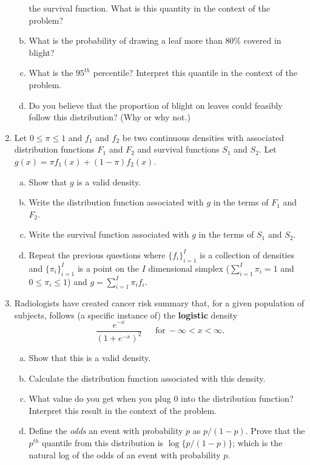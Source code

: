 \documentclass[12pt]{article}
\begin{document}
\begin{enumerate}[1.]
\begin{enumerate}[a.]
    the survival function. What is this quantity in the context of the problem?
  \item What is the probability of drawing a leaf more than 80\% covered in blight?
  \item What is the $95^{th}$ percentile? Interpret this quantile in the context of the problem.
  \item Do you believe that the proportion of blight on leaves could feasibly follow this
    distribution? (Why or why not.)
  \end{enumerate}
\item Let $0 \leq \pi \leq 1$ and $f_1$ and $f_2$ be two continuous
  densities with associated distribution functions $F_1$ and $F_2$ and
  survival functions $S_1$ and $S_2$. Let $g(x) = \pi f_1(x) + (1 - \pi)f_2(x)$.
  \begin{enumerate}[a.]
	\item Show that $g$ is a valid density.
	\item Write the distribution function associated with $g$ in the terms of
          $F_1$ and $F_2$.
        \item Write the survival function associated with $g$ in the
          terms of $S_1$ and $S_2$.
          \item Repeat the previous questions where $\{f_i\}_{i=1}^I$ is a collection of
          densities and $\{\pi_i\}_{i=1}^I$ is a point on the $I$ dimensional simplex
          ($\sum_{i=1}^I \pi_i = 1$ and $0 \leq \pi_i \leq 1$) and $g = \sum_{i=1}^I \pi_i f_i$.
          \end{enumerate}  
\item  Radiologists have created cancer risk summary that, for a given
  population of subjects, follows (a specific instance of) the {\bf logistic} density
  $$
  \frac{e^{-x}}{(1 + e^{-x})^2} ~~~~~~~\mbox{for}~ -\infty < x < \infty.
  $$
  \begin{enumerate}[a.]
  \item Show that this is a valid density.
  \item Calculate the distribution function associated with this density.
  \item What value do you get when you plug $0$ into the distribution function? Interpret this
    result in the context of the problem.
  \item Define the {\em odds} an event with probability $p$
    as $p / (1 - p)$. Prove that the $p^{th}$ quantile from this
    distribution is $\log\{p / (1 - p)\}$; which is the natural log of
    the odds of an event with probability $p$.

\end{enumerate}
\end{enumerate}
\end{document}
